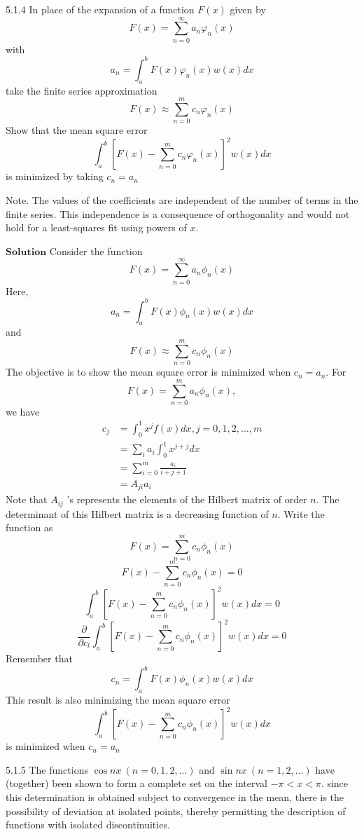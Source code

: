 \documentclass{article}
\begin{document}
\begin{flushleft}
\newpage

\begin{mybox}{5.1.4}
In place of the expansion of a function $F(x)$ given by
$$
F(x)=\sum_{n=0}^{\infty} a_{n} \varphi_{n}(x)
$$
with
$$
a_{n}=\int_{a}^{b} F(x) \varphi_{n}(x) w(x) d x
$$
take the finite series approximation
$$
F(x) \approx \sum_{n=0}^{m} c_{n} \varphi_{n}(x)
$$
Show that the mean square error
$$
\int_{a}^{b}\left[F(x)-\sum_{n=0}^{m} c_{n} \varphi_{n}(x)\right]^{2} w(x) d x
$$
is minimized by taking $c_{n}=a_{n}$

Note. The values of the coefficients are independent of the number of terms in the finite series. This independence is a consequence of orthogonality and would not hold for a least-squares fit using powers of $x$.
\end{mybox}




$\boxed{\textbf{Solution}}$ Consider the function 
$$
F(x)=\sum_{n=0}^{\infty} a_{n} \phi_{n}(x)
$$
Here, $$a_{n}=\int_{a}^{b} F(x) \phi_{n}(x) w(x) d x$$ and $$F(x) \approx \sum_{n=0}^{m} c_{n} \phi_{n}(x)$$
The objective is to show the mean square error is minimized when $c_{n}=a_{n}$.
For $$F(x)=\sum_{n=0}^{m} a_{n} \phi_{n}(x),$$ we have
$$\begin{aligned} c_{j} &=\int_{0}^{1} x^{j} f(x) d x, j=0,1,2, \ldots, m \\ &=\sum_{i} a_{i} \int_{0}^{1} x^{j+j} d x \\ &=\sum_{i=0}^{m} \frac{a_{i}}{i+j+1} \\ &=A_{j i} a_{i} \end{aligned}$$
Note that $A_{i j}$ 's represents the elements of the Hilbert matrix of order $n$.
The determinant of this Hilbert matrix is a decreasing function of $n$.
Write the function as
$$
F(x)=\sum_{n=0}^{m} c_{n} \phi_{n}(x)
$$
$$
F(x)-\sum_{n=0}^{m} c_{n} \phi_{n}(x)=0
$$
$$
\int_{a}^{b}\left[F(x)-\sum_{n=0}^{m} c_{n} \phi_{n}(x)\right]^{2} w(x) d x=0
$$
$$
\frac{\partial}{\partial c_{l}} \int_{a}^{b}\left[F(x)-\sum_{n=0}^{m} c_{n} \phi_{n}(x)\right]^{2} w(x) d x=0
$$
Remember that
$$
c_{n}=\int_{a}^{b} F(x) \phi_{n}(x) w(x) d x
$$
This result is also minimizing the mean square error $$\int_{a}^{b}\left[F(x)-\sum_{n=0}^{m} c_{n} \phi_{n}(x)\right]^{2} w(x) d x$$ is
minimized when $c_{n}=a_{n}$

\newpage

\begin{mybox}{5.1.5}
The functions $\cos n x \ (n=0,1,2, \ldots)$ and $\sin n x \ (n=1,2, \ldots)$ have (together) been shown to form a complete set on the interval $-\pi<x<\pi .$ since this determination is obtained subject to convergence in the mean, there is the possibility of deviation at isolated points, thereby permitting the description of functions with isolated discontinuities.


\end{mybox}
\end{flushleft}
\end{document}
